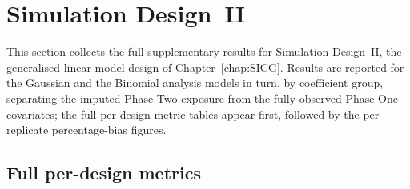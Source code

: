 \clearpage
\section{Simulation Design~II}
\label{app:suppC_simI}

This section collects the full supplementary results for Simulation Design~II, the generalised-linear-model design of Chapter~\ref{chap:SICG}. Results are reported for the Gaussian and the Binomial analysis models in turn, by coefficient group, separating the imputed Phase-Two exposure from the fully observed Phase-One covariates; the full per-design metric tables appear first, followed by the per-replicate percentage-bias figures.

\subsection{Full per-design metrics}

